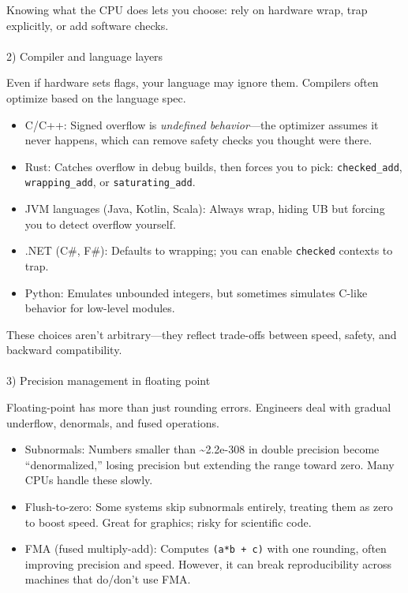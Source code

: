\documentclass[
  letterpaper,
  DIV=11,
  numbers=noendperiod]{scrreprt}
\makeatletter
\let\oldparagraph\paragraph
\renewcommand{\paragraph}{
    \@ifstar
      \xxxParagraphStar
      \xxxParagraphNoStar
  }
\newcommand{\xxxParagraphStar}[1]{\oldparagraph*{#1}\mbox{}}
\newcommand{\xxxParagraphNoStar}[1]{\oldparagraph{#1}\mbox{}}
\providecommand{\tightlist}{%
  \setlength{\itemsep}{0pt}\setlength{\parskip}{0pt}}
\makeatother
\begin{document}
Knowing what the CPU does lets you choose: rely on hardware wrap, trap
explicitly, or add software checks.

\paragraph{2) Compiler and language
layers}\label{compiler-and-language-layers}

Even if hardware sets flags, your language may ignore them. Compilers
often optimize based on the language spec.

\begin{itemize}
\tightlist
\item
  C/C++: Signed overflow is \emph{undefined behavior}---the optimizer
  assumes it never happens, which can remove safety checks you thought
  were there.
\item
  Rust: Catches overflow in debug builds, then forces you to pick:
  \texttt{checked\_add}, \texttt{wrapping\_add}, or
  \texttt{saturating\_add}.
\item
  JVM languages (Java, Kotlin, Scala): Always wrap, hiding UB but
  forcing you to detect overflow yourself.
\item
  .NET (C\#, F\#): Defaults to wrapping; you can enable \texttt{checked}
  contexts to trap.
\item
  Python: Emulates unbounded integers, but sometimes simulates C-like
  behavior for low-level modules.
\end{itemize}

These choices aren't arbitrary---they reflect trade-offs between speed,
safety, and backward compatibility.

\paragraph{3) Precision management in floating
point}\label{precision-management-in-floating-point}

Floating-point has more than just rounding errors. Engineers deal with
gradual underflow, denormals, and fused operations.

\begin{itemize}
\tightlist
\item
  Subnormals: Numbers smaller than \textasciitilde2.2e-308 in double
  precision become ``denormalized,'' losing precision but extending the
  range toward zero. Many CPUs handle these slowly.
\item
  Flush-to-zero: Some systems skip subnormals entirely, treating them as
  zero to boost speed. Great for graphics; risky for scientific code.
\item
  FMA (fused multiply-add): Computes \texttt{(a*b\ +\ c)} with one
  rounding, often improving precision and speed. However, it can break
  reproducibility across machines that do/don't use FMA.
\end{itemize}
\end{document}
